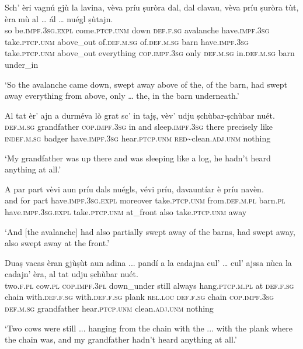 \begin{linenumbers}
\gll Sch’ èri vagnú gjù la lavina, vèva príu ṣuròra dal, dal clavau, vèva príu ṣuròra tùt, èra mù al … ál … nuégl ṣùtajn.\\
so be.\textsc{impf.3sg}.\textsc{expl} come.\textsc{ptcp.unm} down \textsc{def.f.sg} avalanche have.\textsc{impf.3sg} take.\textsc{ptcp.unm} above\_out of.\textsc{def.m.sg} of.\textsc{def.m.sg} barn have.\textsc{impf.3sg} take.\textsc{ptcp.unm} above\_out everything \textsc{cop.impf.3sg} only \textsc{def.m.sg} {} in.\textsc{def.m.sg} {} barn under\_in \\
\end{linenumbers}
\medskip
\glt `So the avalanche came down, swept away above of the, of the barn, had swept away everything from above, only … the, in the barn underneath.'
\medskip

\begin{linenumbers}
\gll  Al tat èr’ ajn a durméva lò grat sc’ in tajṣ, vèv’ udju ṣchùbar-ṣchùbar nuét.  \\
 \textsc{def.m.sg} grandfather \textsc{cop.impf.3sg} in and sleep.\textsc{impf.3sg} there precisely like \textsc{indef.m.sg} badger have.\textsc{impf.3sg} hear.\textsc{ptcp.unm} \textsc{red}\textasciitilde{clean}.\textsc{adj.unm} nothing\\
\end{linenumbers}
\medskip
\glt `My grandfather was up there and was sleeping like a log, he hadn’t heard anything at all.'
\medskip

\begin{linenumbers}
\gll  A par part vèvi aun príu dals nuégls, vévi príu, davauntíar è príu navèn.\\
and for part have.\textsc{impf.3sg.expl} moreover take.\textsc{ptcp.unm} from.\textsc{def.m.pl} barn.\textsc{pl} 
have.\textsc{impf.3sg.expl} take.\textsc{ptcp.unm} at\_front also take.\textsc{ptcp.unm} away \\
\end{linenumbers}
\medskip
\glt `And [the avalanche] had also partially swept away of the barns, had swept away, also swept away at the front.'
\medskip

\begin{linenumbers}
\gll  Duaṣ vacas èran gjùṣùt aun adina ...  pandí\footnotemark{} a la cadajna cul’ … cul’ ajssa nùca la cadajn' èra, al tat udju ṣchùbar nuét.  \\
 two.\textsc{f.pl} cow.\textsc{pl} \textsc{cop.impf.3pl} down\_under still always {} hang.\textsc{ptcp.m.pl} at \textsc{def.f.sg} chain with.\textsc{def.f.sg} {} with.\textsc{def.f.sg} plank \textsc{rel.loc} \textsc{def.f.sg} chain \textsc{cop.impf.3sg} \textsc{def.m.sg} grandfather hear.\textsc{ptcp.unm} clean.\textsc{adj.unm} nothing\\
\end{linenumbers}
\medskip
\glt `Two cows were still ... hanging  from the chain with the ... with the plank where the chain was, and my grandfather hadn’t heard anything at all.’
\medskip

